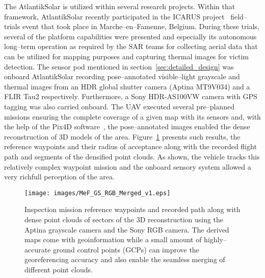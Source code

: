 The AtlantikSolar is utilized within several research projects. Within that framework, AtlantikSolar recently participated in the ICARUS project~\cite{ICARUSwebsite} field--trials event that took place in Marche--en--Famenne, Belgium. During these trials, several of the platform capabilities were presented and especially its autonomous long--term operation as required by the SAR teams for collecting aerial data that can be utilized for mapping purposes and capturing thermal images for victim detection. The sensor pod mentioned in section~\ref{sec:detailed_design} was onboard AtlantikSolar recording pose--annotated visible--light grayscale and thermal images from an HDR global shutter camera (Aptina MT9V034) and a FLIR Tau2 respectively. Furthermore, a Sony HDR-AS100VW camera with GPS tagging was also carried onboard. The UAV executed several pre--planned missions ensuring the complete coverage of a given map with its sensors and, with the help of the Pix4D software~\cite{Pix4Dsite}, the pose--annotated images enabled the dense reconstruction of $3\textrm{D}$ models of the area. Figure~\ref{fig:mef_icarus_reconstruction} presents such results, the reference waypoints and their radius of acceptance along with the recorded flight path and segments of the densified point clouds. As shown, the vehicle tracks this relatively complex waypoint mission and the onboard sensory system allowed a very richfull perception of the area.

%
\begin{figure}[htbp]
\begin{center}
  \texttt{[image: images/MeF\_GS\_RGB\_Merged\_v1.eps]} %
\end{center}
\caption{Inspection mission reference waypoints and recorded path along with dense point clouds of sectors of the $3\textrm{D}$ reconstruction using the Aptina grayscale camera and the Sony RGB camera. The derived maps come with geoinformation while a small amount of highly--accurate ground control points (GCPs) can improve the georeferencing accuracy and also enable the seamless merging of different point clouds.  }
\label{fig:mef_icarus_reconstruction}
\end{figure}
%

